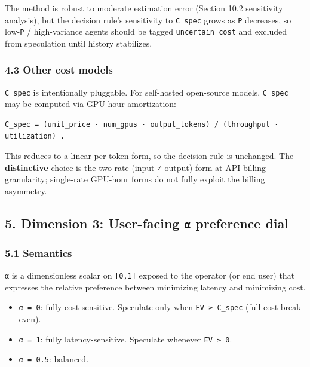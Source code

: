 \documentclass[
  11pt,
]{article}
\providecommand{\tightlist}{%
  \setlength{\itemsep}{0pt}\setlength{\parskip}{0pt}}
\begin{document}
The method is robust to moderate estimation error (Section 10.2
sensitivity analysis), but the decision rule's sensitivity to
\texttt{C\_spec} grows as \texttt{P} decreases, so low-\texttt{P} /
high-variance agents should be tagged \texttt{uncertain\_cost} and
excluded from speculation until history stabilizes.

\subsubsection{4.3 Other cost models}\label{other-cost-models}

\texttt{C\_spec} is intentionally pluggable. For self-hosted open-source
models, \texttt{C\_spec} may be computed via GPU-hour amortization:

\begin{verbatim}
C_spec = (unit_price · num_gpus · output_tokens) / (throughput · utilization) .
\end{verbatim}

This reduces to a linear-per-token form, so the decision rule is
unchanged. The \textbf{distinctive} choice is the two-rate (input ≠
output) form at API-billing granularity; single-rate GPU-hour forms do
not fully exploit the billing asymmetry.

\subsection{\texorpdfstring{5. Dimension 3: User-facing \texttt{α}
preference
dial}{5. Dimension 3: User-facing α preference dial}}\label{dimension-3-user-facing-ux3b1-preference-dial}

\subsubsection{5.1 Semantics}\label{semantics}

\texttt{α} is a dimensionless scalar on \texttt{{[}0,1{]}} exposed to
the operator (or end user) that expresses the relative preference
between minimizing latency and minimizing cost.

\begin{itemize}
\tightlist
\item
  \texttt{α\ =\ 0}: fully cost-sensitive. Speculate only when
  \texttt{EV\ ≥\ C\_spec} (full-cost break-even).
\item
  \texttt{α\ =\ 1}: fully latency-sensitive. Speculate whenever
  \texttt{EV\ ≥\ 0}.
\item
  \texttt{α\ =\ 0.5}: balanced.
\end{itemize}
\end{document}
